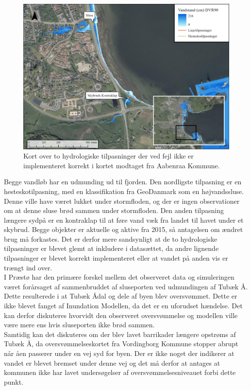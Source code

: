 \begin{figure}[H]
    \centering
    \includegraphics[width=0.8\linewidth]{images/diskussion/tilpasnings_error.jpg}
    \caption{Kort over to hydrologiske tilpasninger der ved fejl ikke er implementeret korrekt i kortet modtaget fra Aabenraa Kommune.}
    \label{Figur: Tilpasnings fejl}
\end{figure}
Begge vandløb har en udmunding ud til fjorden. Den nordligste tilpasning er en hesteskotilpasning, med en klassifikation fra GeoDanmark som en højvandssluse. Denne ville have været lukket under stormfloden, og der er ingen observationer om at denne sluse brød sammen under stormfloden. Den anden tilpasning længere sydpå er en kontraklap til at føre vand væk fra landet til havet under et skybrud. Begge objekter er aktuelle og aktive fra 2015, så antagelsen om ændret brug må forkastes. Det er derfor mere sandsynligt at de to hydrologiske tilpasninger er blevet glemt at inkludere i datasættet, da andre lignende tilpasninger er blevet korrekt implementeret eller at vandet på anden vis er trængt ind over. \\  


I Præstø har den primære forskel mellem det observeret data og simuleringen været forårsaget af sammenbruddet af sluseporten ved udmundingen af Tubæk Å. Dette resulterede i at Tubæk Ådal og dele af byen blev oversvømmet. Dette er ikke blevet fanget af Inundation Modellen, da det er en uforudset hændelse. Det kan derfor diskuteres hvorvidt den observeret oversvømmelse og modellen ville være mere ens hvis sluseporten ikke brød sammen. \\
Samtidig kan det diskuteres om der blev lavet barrikader længere opstrøms af Tubæk Å, da oversvømmelseskortet fra Vordingborg Kommune stopper abrupt når åen passerer under en vej syd for byen. Der er ikke noget der indikerer at vandet er blevet bremset under denne vej og det må derfor at antages at kommunen ikke har lavet undersøgelser af oversvømmelsesniveauet forbi dette punkt. \\

